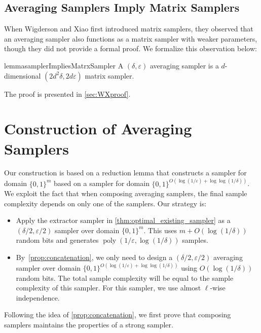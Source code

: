 \documentclass[11pt,letterpaper]{article}
\DeclareMathOperator*{\poly}{poly}
\newcommand{\eps}{\varepsilon}
\newcommand{\1}{\mathbbm{1}}
\newcommand{\zo}{\{0, 1\}}
\begin{document}
\subsection{Averaging Samplers Imply Matrix Samplers}
When Wigderson and Xiao first introduced matrix samplers, they observed that an averaging sampler also functions as a matrix sampler with weaker parameters, though they did not provide a formal proof. We formalize this observation below:
\begin{restatable}{lemma}{samplerImpliesMatrxSampler}
\label{lem:sampler_implies_matrix_sampler}
    A $(\delta, \eps)$ averaging sampler is a $d$-dimensional $(2d^2 \delta, 2 d \eps)$ matrix sampler.
\end{restatable}
The proof is presented in \cref{sec:WXproof}.



\section{Construction of Averaging Samplers}
Our construction is based on a reduction lemma that constructs a sampler for domain $\zo^m$ based on a sampler for domain $\zo^{O(\log (1 / \eps) + \log\log(1 / \delta))}$. 
We exploit the fact that when composing averaging samplers, the final sample complexity depends on only one of the samplers. Our strategy is:
\begin{itemize}
    \item Apply the extractor sampler in \cref{thm:optimal_existing_sampler} as a $(\delta / 2, \eps / 2)$ sampler over domain $\zo^m$. This uses $m + O(\log (1 / \delta))$ random bits and generates $\poly(1/\eps, \log (1 / \delta))$ samples.
    \item By~\cref{prop:concatenation}, we only need to design a $(\delta / 2, \eps / 2)$ averaging sampler over domain $\zo^{O(\log (1 / \eps) + \log\log(1 / \delta))}$ using $O(\log(1 / \delta))$ random bits. The total sample complexity will be equal to the sample complexity of this sampler. For this sampler, we use almost $\ell$-wise independence.     
\end{itemize}

Following the idea of \cref{prop:concatenation}, 
we first prove that composing samplers maintains the properties of a strong sampler.
\end{document}
